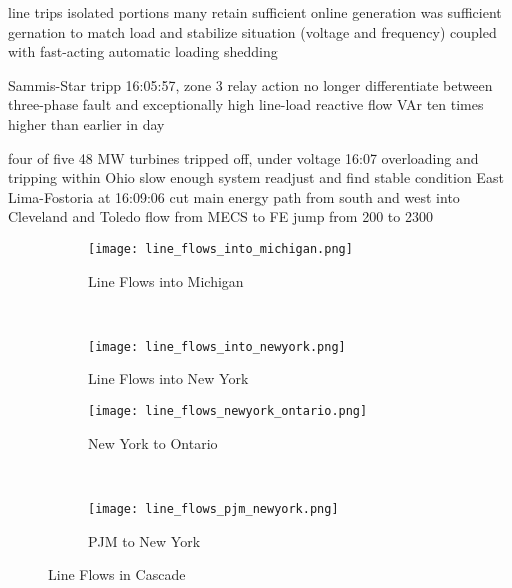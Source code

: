 line trips isolated portions
many retain sufficient online generation
was sufficient gernation to match load and stabilize situation (voltage and frequency)
coupled with fast-acting automatic loading shedding

Sammis-Star tripp 16:05:57, zone 3 relay action
no longer differentiate between three-phase fault and exceptionally high line-load
reactive flow VAr ten times higher than earlier in day

four of five 48 MW turbines tripped off, under voltage 16:07
overloading and tripping within Ohio slow enough system readjust and find stable condition
East Lima-Fostoria at 16:09:06
cut main energy path from south and west into Cleveland and Toledo
flow from MECS to FE jump from 200 to 2300

\begin{figure}
        \centering
        \begin{subfigure}[b]{0.5\textwidth}
                \centering
                \texttt{[image: line\_flows\_into\_michigan.png]}
                \caption{Line Flows into Michigan}
                \label{fig:gull}
        \end{subfigure}%
        ~ %
        \begin{subfigure}[b]{0.5\textwidth}
                \centering
                \texttt{[image: line\_flows\_into\_newyork.png]}
                \caption{Line Flows into New York}
                \label{fig:tiger}
        \end{subfigure}

        \begin{subfigure}[b]{0.485\textwidth}
                \centering
                \texttt{[image: line\_flows\_newyork\_ontario.png]}
                \caption{New York to Ontario}
                \label{fig:tiger}
        \end{subfigure}
        ~ %
        \begin{subfigure}[b]{0.485\textwidth}
                \centering
                \texttt{[image: line\_flows\_pjm\_newyork.png]}
                \caption{PJM to New York}
                \label{fig:tiger}
        \end{subfigure}
        \caption{Line Flows in Cascade}\label{fig:animals}
\end{figure}

